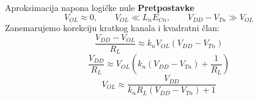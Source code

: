 \begin{frame}[label=09_1-s017]{Aproksimacija napona logičke nule}\setlength{\parskip}{2pt}\setlength{\abovedisplayskip}{4pt}\setlength{\belowdisplayskip}{4pt}\setlength{\abovedisplayshortskip}{3pt}\setlength{\belowdisplayshortskip}{3pt}
\textbf{Pretpostavke}\[V_{OL}\approx0,\qquad V_{OL}\ll L_nE_{Cn},\qquad V_{DD}-V_{Tn}\gg V_{OL}\]
Zanemarujemo korekciju kratkog kanala i kvadratni član:\[\frac{V_{DD}-V_{OL}}{R_L}\approx k_nV_{OL}(V_{DD}-V_{Tn})\]
\[\frac{V_{DD}}{R_L}\approx V_{OL}\left(k_n(V_{DD}-V_{Tn})+\frac1{R_L}\right)\]
\medskip\alert{\[V_{OL}\approx\frac{V_{DD}}{k_nR_L(V_{DD}-V_{Tn})+1}\]
}
\end{frame}
